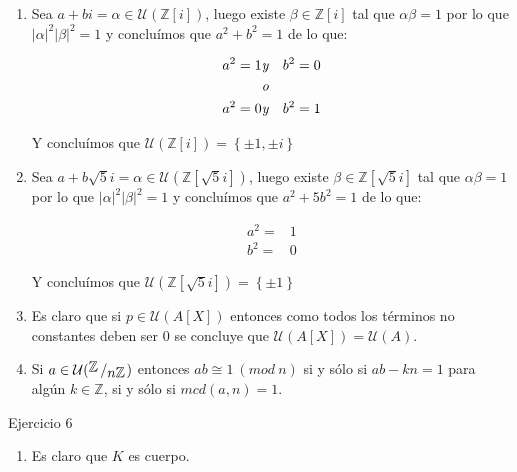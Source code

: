 \documentclass[11pt]{article}
\newcommand{\Z}{\mathbb{Z}}
\newcommand\abs[1]{\left\lvert#1\right\rvert}
\newcommand{\sett}[1]{\left\lbrace#1\right\rbrace}
\newcommand{\quotient}[2]{{\raisebox{.2em}{$#1$}\left/\raisebox{-.2em}{$#2$}\right.}}
\newenvironment{proof}[1][Demostraci\'on]{\begin{trivlist}
		\item[\hskip \labelsep {\bfseries #1}]}{\end{trivlist}}
\newcommand{\qed}{\nobreak \ifvmode \relax \else
	\ifdim\lastskip<1.5em \hskip-\lastskip
	\hskip1.5em plus0em minus0.5em \fi \nobreak
	\vrule height0.75em width0.5em depth0.25em\fi}
\begin{document}
\begin{enumerate}
\begin{proof}
\begin{itemize}
\begin{enumerate}
				\item Sea $a+bi=\alpha \in \mathcal{U}(\Z[i])$, luego existe $\beta \in \Z[i]$ tal que $\alpha \beta = 1$ por lo que $\abs{\alpha}^2 \abs{\beta}^2 = 1$ y conclu\'imos que $a^2 + b^2 = 1$ de lo que:
				
				\[
				\begin{aligned}
					a^2 = 1 & \emph{y} & b^2 = 0 \\
					& \emph{o} & \\
					a^2 = 0 & \emph{y} & b^2 = 1 					
				\end{aligned}
				\]
				
				Y conclu\'imos que $\mathcal{U}(\Z[i]) = \sett{\pm 1 , \pm i}$
				
				\item Sea $a+b\sqrt{5}i=\alpha \in \mathcal{U}(\Z[\sqrt{5}i])$, luego existe $\beta \in \Z[\sqrt{5}i]$ tal que $\alpha \beta = 1$ por lo que $\abs{\alpha}^2 \abs{\beta}^2 = 1$ y conclu\'imos que $a^2 + 5b^2 = 1$ de lo que:
				
				\[
				\begin{aligned}
				a^2 = & 1 \\
				b^2 = & 0  					
				\end{aligned}
				\]
				
				Y conclu\'imos que $\mathcal{U}(\Z[\sqrt{5}i]) = \sett{\pm 1}$
					
				\item Es claro que si $p \in \mathcal{U}(A[X])$ entonces como todos los t\'erminos no constantes deben ser $0$ se concluye que $ \mathcal{U}(A[X]) =  \mathcal{U}(A)$.
				
				\item Si $a \in  \mathcal{U}(\quotient{\Z}{n\Z})$ entonces $ab \cong 1 \ (mod \ n)$ si y s\'olo si $ab - kn = 1$ para alg\'un $k \in \Z$, si y s\'olo si $mcd(a,n) = 1$. \qed
			\end{enumerate}
			
		\end{itemize}
		
	\end{proof}
	
	\item Ejercicio 6
	
	\label{Ejercicio 6}
	
	\begin{proof}
		
		\begin{enumerate}
			
			\item Es claro que $K$ es cuerpo.
			

\end{enumerate}
\end{proof}
\end{enumerate}
\end{document}
